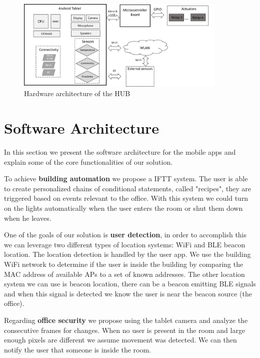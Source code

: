 \begin{figure}[h]
\centering
\includegraphics[width=0.9\textwidth]{Figures/hardware}
\caption{Hardware architecture of the HUB}
\label{architecture_system}
\end{figure}


\section{Software Architecture}\label{architecture4} 

In this section we present the software architecture for the mobile apps and explain some of the core functionalities of our solution.

To achieve \textbf{building automation} we propose a \ac{IFTT} system. The user is able to create personalized chains of conditional statements, called "recipes", they are triggered based on events relevant to the office. With this system we could turn on the lights automatically when the user enters the room or shut them down when he leaves.

One of the goals of our solution is \textbf{user detection}, in order to accomplish this we can leverage two different types of location systems: \ac{WiFi} and \ac{BLE} beacon location. The location detection is handled by the user app. We use the building \ac{WiFi} network to determine if the user is inside the building by comparing the \ac{MAC address} of available \ac{AP}s to a set of known addresses. The other location system we can use is beacon location, there can be a beacon emitting \ac{BLE} signals and when this signal is detected we know the user is near the beacon source (the office).

Regarding \textbf{office security} we propose using the tablet camera and analyze the consecutive frames for changes. When no user is present in the room and large enough pixels are different we assume movement was detected. We can then notify the user that someone is inside the room.


